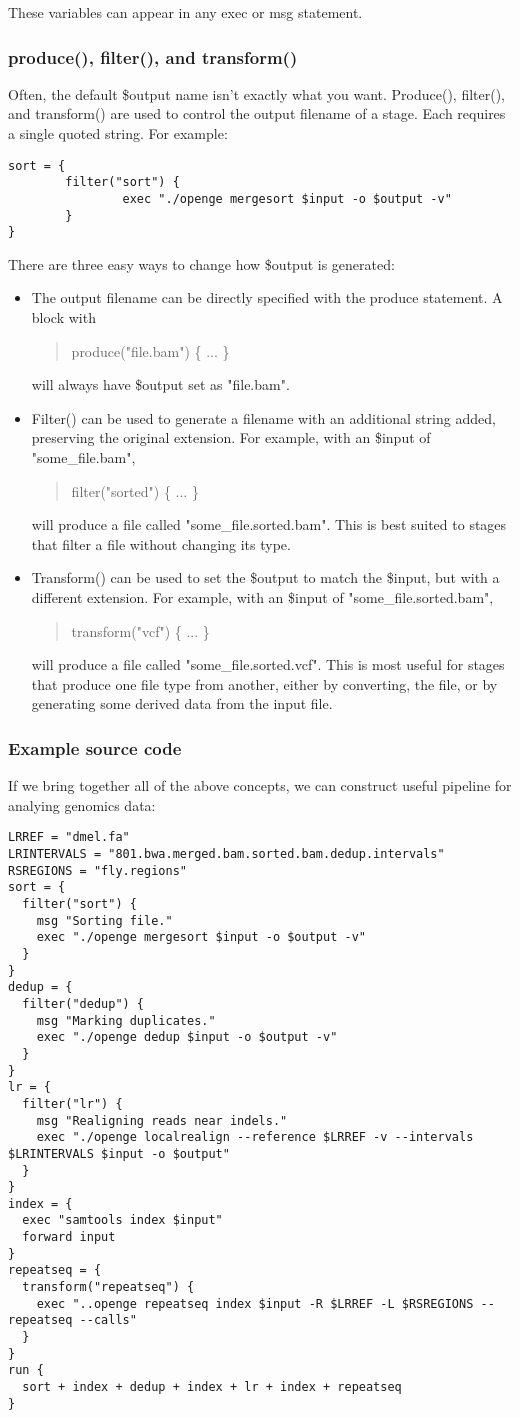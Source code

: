 \documentclass[11pt]{article}
\newcommand {\cmd}[1] {\begin{quote}#1\end{quote}}
\begin{document}
These variables can appear in any exec or msg statement.

\subsubsection{produce(), filter(), and transform()}
Often, the default \$output name isn't exactly what you want. Produce(), filter(), and transform() are used to control the output filename of a stage. Each requires a single quoted string. For example:

\begin{verbatim}
sort = {
        filter("sort") {
                exec "./openge mergesort $input -o $output -v"
        }
}
\end{verbatim}

There are three easy ways to change how \$output is generated:
\begin{itemize}
\item The output filename can be directly specified with the produce statement. A block with
\cmd{produce("file.bam") \{ ... \} }
will always have \$output set as "file.bam".
\item Filter() can be used to generate a filename with an additional string added, preserving the original extension. For example, with an \$input of "some\_file.bam",
\cmd{filter("sorted") \{ ... \} }
will produce a file called "some\_file.sorted.bam". This is best suited to stages that filter a file without changing its type.
\item Transform() can be used to set the \$output to match the \$input, but with a different extension. For example, with an \$input of "some\_file.sorted.bam",
\cmd{transform("vcf") \{ ... \} }
will produce a file called "some\_file.sorted.vcf". This is most useful for stages that produce one file type from another, either by converting, the file, or by generating some derived data from the input file.
\end{itemize}

\subsubsection{Example source code}
If we bring together all of the above concepts, we can construct useful pipeline for analying genomics data:
\begin{verbatim}
LRREF = "dmel.fa"
LRINTERVALS = "801.bwa.merged.bam.sorted.bam.dedup.intervals"
RSREGIONS = "fly.regions"
sort = {
  filter("sort") {
    msg "Sorting file."
    exec "./openge mergesort $input -o $output -v"
  }
}
dedup = {
  filter("dedup") {
    msg "Marking duplicates."
    exec "./openge dedup $input -o $output -v"
  }
}
lr = {
  filter("lr") {
    msg "Realigning reads near indels."
    exec "./openge localrealign --reference $LRREF -v --intervals $LRINTERVALS $input -o $output"
  }
}
index = {
  exec "samtools index $input"
  forward input
}
repeatseq = {
  transform("repeatseq") {
    exec "..openge repeatseq index $input -R $LRREF -L $RSREGIONS --repeatseq --calls"
  }
}
run {
  sort + index + dedup + index + lr + index + repeatseq
}
\end{verbatim}
\end{document}
